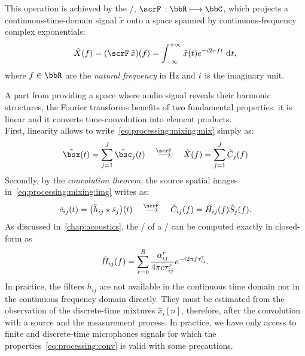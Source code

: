 This operation is achieved by the \FTdef/, $\fourierTrans{}:\bbR\kmapsto\bbC$, which projects a continuous-time-domain signal $\tilde{x}$ onto a space spanned by continuous-frequency complex exponentials:
\begin{equation}\label{eq:processing:ft}
    \tilde{X}(f) = (\fourierTrans{\tilde{x}})(f) =
        \int_{-\infty}^{+\infty}
        \tilde{x}(t)
        \cste^{-\csti 2 \pi f t}
        \,\kdiff{t}
    ,
\end{equation}
where $f \in \bbR$ are the \textit{natural frequency} in $\si{\Hz}$ and ${i}$ is the imaginary unit.


A part from providing a space where audio signal reveals their harmonic structures, the Fourier transforms benefits of two fundamental properties:
it is linear and it converts time-convolution into element products.
\\First, linearity allows to write~\cref{eq:processing:mixing:mix} simply as:
\begin{equation}\label{eq:processing:ft:mix}
    \tilde{\mics}( t) = \sum_{\idxSrc=1}^{\numSrcs} \tilde{\imgs}_\idxSrc( t)
    \mathspace\overset{\fourierTrans{}}{\kto}\mathspace
    \tilde{X}( f) = \sum_{\idxSrc=1}^{\numSrcs} \tilde{C}_\idxSrc( f)
\end{equation}
Secondly, by the \textit{convolution theorem}, the source spatial images in~\cref{eq:processing:mixing:img} writes as:
\begin{equation}\label{eq:processing:conv}
    \tilde{\img}_{\idxMic\idxSrc}( t) =  \kparen{\tilde{\rir}_{\idxMic\idxSrc} \convCont \tilde{\src}_\idxSrc} ( t)
    \mathspace\overset{\fourierTrans{}}{\kto}\mathspace
    \tilde{C}_{\idxMic\idxSrc}( f) =  \tilde{H}_{\idxMic\idxSrc}( f) \tilde{S}_\idxSrc( f)
    .
\end{equation}
As discussed in~\cref{chap:acoustics}, the \FT/ of a \RIR/ can be computed exactly in closed-form as
\begin{equation}\label{eq:processing:rir:ft}
    \tilde{H}_{ij}( f) = \sum_{r=0}^{R}
    \frac{\alpha_{ij}^r}{4 \pi c \tau_{ij}^r}
    {e}^{- {i} 2 \pi f \tau_{ij}^r}
    .
\end{equation}
In practice, the filters $\tilde{h}_{ij}$ are not available in the continuous time domain nor in the continuous frequency domain directly.
They must be estimated from the observation of the discrete-time mixtures $\hat{x}_i[n]$, therefore,
after the convolution with a source and the measurement process.
In practice, we have only access to finite and discrete-time microphones signals for which the properties~\eqref{eq:processing:conv} is valid with some precautions.


